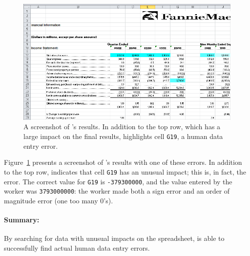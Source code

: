 \begin{figure}[!t]
\centering
\includegraphics[width=5.5in]{images/fannie_mae_outlier}
  \caption{A screenshot of \checkcell{}'s results. In addition to the top row, which has a large impact on the final results, \checkcell{} highlights cell \texttt{G19}, a human data entry error.\label{fig:fannie_mae}}
\end{figure}

Figure~\ref{fig:fannie_mae} presents a screenshot of \checkcell{}'s
results with one of these errors. In addition to the top
row, \checkcell{} indicates that cell \texttt{G19} has an unusual
impact; this is, in fact, the error. The correct value
for \texttt{G19} is \texttt{-379300000}, and the value entered by the
worker was \texttt{3793000000}: the worker made both a sign error and
an order of magnitude error (one too many 0's).

\paragraph{Summary:} By searching for data with unusual impacts on the spreadsheet, \checkcell{} is able to successfully find actual human data entry errors.


